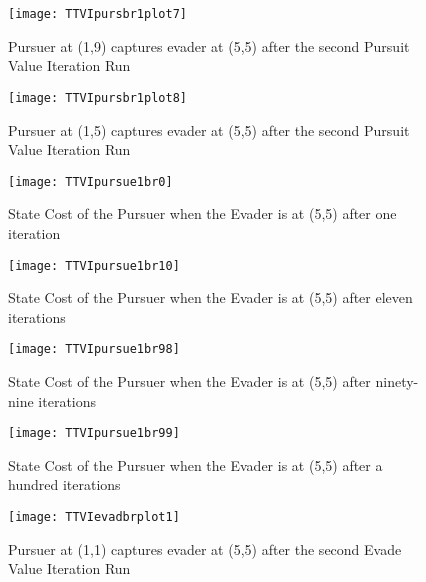 \begin{figure}
\vspace{2.4in}
\centering
\texttt{[image: TTVIpursbr1plot7]}
\caption{Pursuer at (1,9) captures evader at (5,5) after the second Pursuit Value Iteration Run}
\label{TTVIpursbr1plot7}
\end{figure}
\clearpage
\newpage

\begin{figure}
\vspace{2.4in}
\centering
\texttt{[image: TTVIpursbr1plot8]}
\caption{Pursuer at (1,5) captures evader at (5,5) after the second Pursuit Value Iteration Run}
\label{TTVIpursbr1plot8}
\end{figure}
\clearpage
\newpage

\begin{figure}
\vspace{2.4in}
\centering
\texttt{[image: TTVIpursue1br0]}
\caption{State Cost of the Pursuer when the Evader is at (5,5) after one iteration}
\label{TTVIpursue1br0}
\end{figure}
\clearpage
\newpage

\begin{figure}
\vspace{2.4in}
\centering
\texttt{[image: TTVIpursue1br10]}
\caption{State Cost of the Pursuer when the Evader is at (5,5) after eleven iterations}
\label{TTVIpursue1br10}
\end{figure}
\clearpage
\newpage

\begin{figure}
\vspace{2.4in}
\centering
\texttt{[image: TTVIpursue1br98]}
\caption{State Cost of the Pursuer when the Evader is at (5,5) after ninety-nine iterations}
\label{TTVIpursue1br98}
\end{figure}
\clearpage
\newpage

\begin{figure}
\vspace{2.4in}
\centering
\texttt{[image: TTVIpursue1br99]}
\caption{State Cost of the Pursuer when the Evader is at (5,5) after a hundred iterations}
\label{TTVIpursue1br99}
\end{figure}
\clearpage
\newpage

\begin{figure}
\vspace{2.4in}
\centering
\texttt{[image: TTVIevadbrplot1]}
\caption{Pursuer at (1,1) captures evader at (5,5) after the second Evade Value Iteration Run}
\label{TTVIevadbrplot1}
\end{figure}
\clearpage
\newpage

